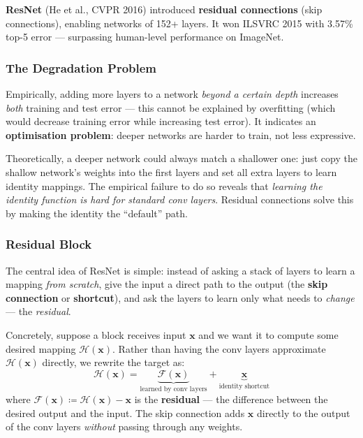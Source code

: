 \documentclass[11pt,a4paper]{article}
\newcommand{\term}[1]{\textcolor{DefGreen}{\textbf{#1}}}
\begin{document}
\term{ResNet} (He et al., CVPR 2016) introduced \term{residual connections} (skip connections), enabling networks of 152+ layers. It won ILSVRC 2015 with 3.57\% top-5 error — surpassing human-level performance on ImageNet.

\subsubsection{The Degradation Problem}

Empirically, adding more layers to a network \emph{beyond a certain depth} increases \emph{both} training and test error — this cannot be explained by overfitting (which would decrease training error while increasing test error). It indicates an \textbf{optimisation problem}: deeper networks are harder to train, not less expressive.

\begin{insightbox}
Theoretically, a deeper network could always match a shallower one: just copy the shallow network's weights into the first layers and set all extra layers to learn identity mappings. The empirical failure to do so reveals that \emph{learning the identity function is hard for standard conv layers}. Residual connections solve this by making the identity the ``default'' path.
\end{insightbox}

\subsubsection{Residual Block}

The central idea of ResNet is simple: instead of asking a stack of layers to learn a mapping \emph{from scratch}, give the input a direct path to the output (the \term{skip connection} or \term{shortcut}), and ask the layers to learn only what needs to \emph{change} — the \emph{residual}.

Concretely, suppose a block receives input $\mathbf{x}$ and we want it to compute some desired mapping $\mathcal{H}(\mathbf{x})$. Rather than having the conv layers approximate $\mathcal{H}(\mathbf{x})$ directly, we rewrite the target as:
\[
  \mathcal{H}(\mathbf{x}) = \underbrace{\mathcal{F}(\mathbf{x})}_{\text{learned by conv layers}} + \underbrace{\mathbf{x}}_{\text{identity shortcut}}
\]
where $\mathcal{F}(\mathbf{x}) \coloneqq \mathcal{H}(\mathbf{x}) - \mathbf{x}$ is the \term{residual} — the difference between the desired output and the input. The skip connection adds $\mathbf{x}$ directly to the output of the conv layers \emph{without} passing through any weights.
\end{document}
